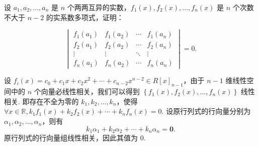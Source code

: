 \begin{exercise}
\begin{exgroup}
        \item 设 $a_1,a_2,\ldots,a_n$ 是 $n$ 个两两互异的实数，$f_1(x),f_2(x),\ldots,f_n(x)$ 是 $n$ 个次数不大于 $n-2$ 的实系数多项式，证明：

        \[\begin{vmatrix}
                f_1(a_1) & f_1(a_2) & \cdots & f_1(a_n) \\
                f_2(a_1) & f_2(a_2) & \cdots & f_2(a_n) \\
                \vdots   & \vdots   & \ddots & \vdots   \\
                f_n(a_1) & f_n(a_2) & \cdots & f_n(a_n)
            \end{vmatrix}=0.\]
        \begin{answer}
            设 $f_i(x) = c_0 + c_1 x + c_2 x^2 + \cdots + c_{n-2} x^{n-2} \in R[x]_{n-1}$，由于 $n-1$ 维线性空间中的 $n$ 个向量必线性相关，我们可以得到 $\left\{ f_1(x), f_2(x), \ldots, f_n(x) \right\}$ 线性相关. 即存在不全为零的 $k_1, k_2, \ldots, k_n$，使得 $\forall x \in \mathbb{R}, k_1 f_1(x) + k_2 f_2(x) + \cdots + k_n f_n(x) = 0$. 设原行列式的行向量分别为 $\alpha_1, \alpha_2, \ldots, \alpha_n$，则有
            \[
                k_1 \alpha_1 + k_2 \alpha_2 + \cdots + k_n \alpha_n = \mathbf{0}.
            \]
            原行列式的行向量组线性相关，因此其值为 $0$.
        \end{answer}


\end{exgroup}
\end{exercise}
